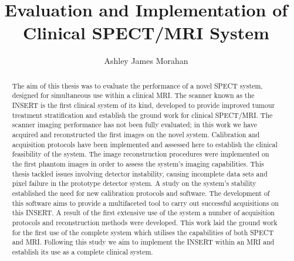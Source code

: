 
\title{Evaluation and Implementation of Clinical SPECT/MRI System}
\author{Ashley James Morahan}

\maketitle
\makedeclaration

\begin{abstract} %
The aim of this thesis was to evaluate the performance of a novel \acrshort{SPECT} system, designed for simultaneous use within a clinical \acrshort{MRI}. The scanner known as the \acrshort{INSERT} is the first clinical system of its kind, developed to provide improved tumour treatment stratification and establish the ground work for clinical \acrshort{SPECT/MRI}. The scanner imaging performance has not been fully evaluated; in this work we have acquired and reconstructed the first images on the novel system. Calibration and acquisition protocols have been implemented and assessed here to establish the clinical feasibility of the system. The image reconstruction procedures were implemented on the first phantom images in order to assess the system's imaging capabilities. This thesis tackled issues involving detector instability, causing incomplete data sets and pixel failure in the prototype detector system. A study on the system's stability established the need for new calibration protocols and software. The development of this software aims to provide a multifaceted tool to carry out successful acquisitions on this \acrshort{INSERT}. A result of the first extensive use of the system a number of acquisition protocols and reconstruction methods were developed.  This work laid the ground work for the first use of the complete system which utilises the capabilities of both \acrshort{SPECT} and \acrshort{MRI}. Following this study we aim to implement the \acrshort{INSERT} within an \acrshort{MRI} and establish its use as a complete clinical system. 
\end{abstract}

